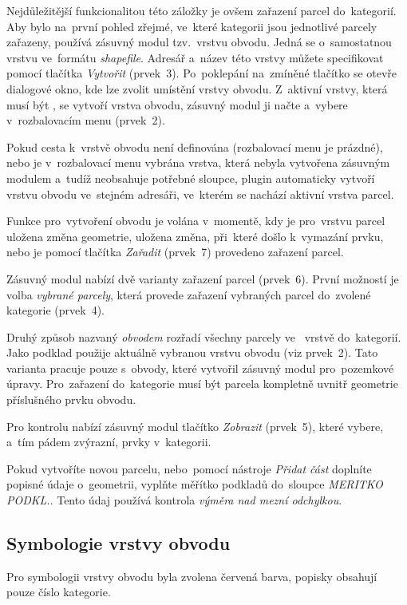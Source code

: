 Nejdůležitější funkcionalitou této záložky je ovšem zařazení parcel
do~kategorií. Aby bylo na~první pohled zřejmé, ve~které kategorii jsou
jednotlivé parcely zařazeny, používá zásuvný modul tzv.~vrstvu
obvodu. Jedná se o~samostatnou vrstvu ve~formátu
\textit{shapefile}. Adresář a~název této vrstvy můžete specifikovat
pomocí tlačítka \textit{Vytvořit} (prvek~3). Po~poklepání na~zmíněné
tlačítko se otevře dialogové okno, kde lze zvolit umístění vrstvy
obvodu. Z~aktivní vrstvy, která musí být , se vytvoří vrstva
obvodu, zásuvný modul ji načte a~vybere v~rozbalovacím menu (prvek~2).

Pokud cesta k~vrstvě obvodu není definována (rozbalovací menu je
prázdné), nebo je v~rozbalovací menu vybrána vrstva, která nebyla
vytvořena zásuvným modulem a~tudíž neobsahuje potřebné sloupce, plugin
automaticky vytvoří vrstvu obvodu ve~stejném adresáři, ve~kterém se
nachází aktivní vrstva parcel.

Funkce pro~vytvoření obvodu je volána v~momentě, kdy je pro~vrstvu
parcel uložena změna geometrie, uložena změna, při~které došlo
k~vymazání prvku, nebo je pomocí tlačítka \textit{Zařadit} (prvek~7)
provedeno zařazení parcel.

Zásuvný modul nabízí dvě varianty zařazení parcel (prvek~6). První
možností je volba \textit{vybrané parcely}, která provede zařazení
vybraných parcel do~zvolené kategorie (prvek~4).

Druhý způsob nazvaný \textit{obvodem} rozřadí všechny parcely
ve~ vrstvě do~ka\-tegorií. Jako podklad použije aktuálně
vybranou vrstvu obvodu (viz prvek~2). Tato varianta pracuje pouze
s~obvody, které vytvořil zásuvný modul pro~pozemkové
úpravy. Pro~zařazení do~kategorie musí být parcela kompletně uvnitř
geometrie příslušného prvku obvodu.

Pro kontrolu nabízí zásuvný modul tlačítko \textit{Zobrazit}
(prvek~5), které vybere, a~tím pádem zvýrazní, prvky v~kategorii.

Pokud vytvoříte novou parcelu, nebo~pomocí nástroje \textit{Přidat
část} doplníte popis\-né údaje o~geometrii, vyplňte měřítko podkladů
do~sloupce \textit{MERITKO PODKL.}. Tento údaj používá kontrola
\textit{výměra nad mezní odchylkou}.

\subsection{Symbologie vrstvy obvodu}
\label{manual_editace_symbologie}

Pro symbologii vrstvy obvodu byla zvolena červená barva, popisky
obsahují pouze číslo kategorie.

